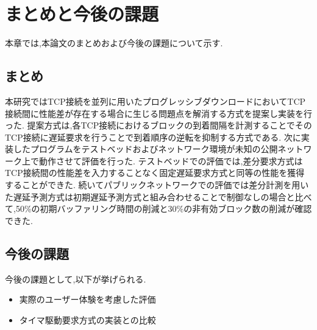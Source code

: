 \documentclass[a4j,12pt]{gradthesis_utf8}
\begin{document}
\chapter{まとめと今後の課題}\label{matomekongo}
本章では,本論文のまとめおよび今後の課題について示す.
\section{まとめ}
本研究ではTCP接続を並列に用いたプログレッシブダウンロードにおいてTCP接続間に性能差が存在する場合に生じる問題点を解消する方式を提案し実装を行った.
提案方式は,各TCP接続におけるブロックの到着間隔を計測することでそのTCP接続に遅延要求を行うことで到着順序の逆転を抑制する方式である.
次に実装したプログラムをテストベッドおよびネットワーク環境が未知の公開ネットワーク上で動作させて評価を行った.
テストベッドでの評価では,差分要求方式はTCP接続間の性能差を入力することなく固定遅延要求方式と同等の性能を獲得することができた.
続いてパブリックネットワークでの評価では差分計測を用いた遅延予測方式は初期遅延予測方式と組み合わせることで制御なしの場合と比べて,50\%の初期バッファリング時間の削減と30\%の非有効ブロック数の削減が確認できた.


\section{今後の課題}
\hspace*{0.5em}今後の課題として,以下が挙げられる.
\begin{itemize}
    \item 実際のユーザー体験を考慮した評価
    \item タイマ駆動要求方式の実装との比較
\end{itemize}
\end{document}
